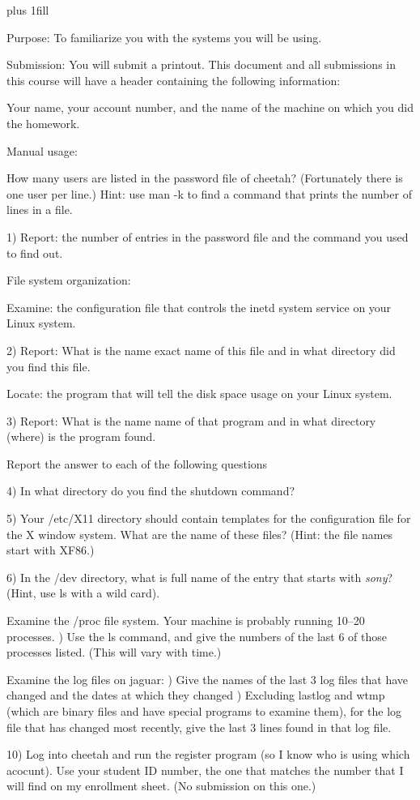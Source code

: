 
\rightskip=0pt plus 1fill

\parindent 0pt

Purpose:
To familiarize you with the systems you will be using.

Submission: You will submit a printout.
This document and all submissions in this course will have a header
containing the following information:

Your name, your account number, and the name of the machine on which you
did the homework.

Manual usage:

How many users are listed in the password file of cheetah?
(Fortunately there is one user per line.)
Hint: use {\ltt{}man -k} to find a command that prints the number
of lines in a file.

1) Report: the number of entries in the password file and
the command you used to find out.

File system organization:

Examine: the configuration file that controls the {\ltt{}inetd} system service
on your Linux system.

2) Report: What is the name exact name of this file
and in what directory did you find this file.

Locate: the program that will tell the disk space usage
on your Linux system.

3) Report: What is the name name of that program 
and in what directory (where) is the program found.

Report the answer to each of the following questions

4) In what directory do you find the {\ltt{}shutdown} command?

5) Your {\ltt{}/etc/X11} directory should contain templates for
the configuration file for the {\ltt{}X} window system.
What are the name of these files?
(Hint: the file names start with XF86.)

6) In the {\ltt{}/dev} directory, what is full name of the entry that starts
with {\it sony}? (Hint, use ls with a wild card).

Examine the {\ltt{}/proc} file system.
Your machine is probably running 10--20 processes.
\hfill{}) Use the {\ltt{}ls} command, and give the numbers of the last 6
of those processes listed. (This will vary with time.)

Examine the log files on {\ltt{}jaguar}:
\hfill{}) Give the names of the last 3 log files that have changed and 
the dates at which they changed
\hfill{}) Excluding {\ltt{}lastlog} and {\ltt{}wtmp} (which are binary files
and have special programs to examine them), 
for the log file that has changed most recently, give the last 3 lines
found in that log file.

10) Log into cheetah and run the register program (so I know who is using
which acocunt). Use your student ID number, the one that matches
the number that I will find on my enrollment sheet.
(No submission on this one.)

\bye
